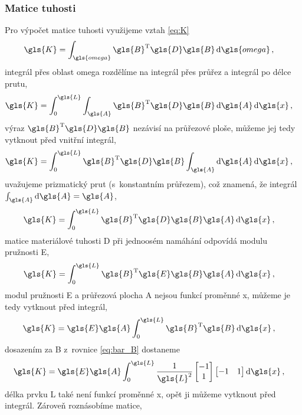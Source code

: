 \subsubsection*{Matice tuhosti}
Pro výpočet matice tuhosti využijeme vztah \ref{eq:K}
\begin{align*}
    \gls{K} &= \int_{\gls{omega}} \gls{B}^{\mathrm{T}}\gls{D}\gls{B} \dd{\gls{omega}},
\end{align*}
integrál přes oblast \gls{omega} rozdělíme na integrál přes průřez a integrál po délce prutu,
\begin{align*}
    \gls{K}  &= \int_{0}^{\gls{L}} \int_{\gls{A}} \gls{B}^{\mathrm{T}}\gls{D}\gls{B} \dd{\gls{A}} \dd{\gls{x}},
\end{align*}
výraz $\gls{B}^{\mathrm{T}}\gls{D}\gls{B}$ nezávisí na průřezové ploše, můžeme jej tedy vytknout před vnitřní integrál,
\begin{align*}
    \gls{K}  &= \int_{0}^{\gls{L}} \gls{B}^{\mathrm{T}}\gls{D}\gls{B} \int_{\gls{A}} \dd{\gls{A}} \dd{\gls{x}},
\end{align*}
uvažujeme prizmatický prut (s~konstantním průřezem), což znamená, že integrál $\int_{\gls{A}}\dd{\gls{A}} = \gls{A}$,
\begin{align*}
    \gls{K} &=\int_{0}^{\gls{L}} \gls{B}^{\mathrm{T}}\gls{D}\gls{B} \gls{A} \dd{\gls{x}},
\end{align*}
matice materiálové tuhosti \gls{D} při jednoosém namáhání odpovídá modulu pružnosti \gls{E},
\begin{align*}
    \gls{K} &=\int_{0}^{\gls{L}} \gls{B}^{\mathrm{T}}\gls{E}\gls{B} \gls{A} \dd{\gls{x}},
\end{align*}
modul pružnosti \gls{E} a průřezová plocha \gls{A} nejsou funkcí proměnné \gls{x}, můžeme je tedy vytknout před integrál,
\begin{align*}
    \gls{K} &= \gls{E} \gls{A} \int_{0}^{\gls{L}} \gls{B}^{\mathrm{T}}\gls{B} \dd{\gls{x}},
\end{align*}
dosazením za \gls{B} z~rovnice \ref{eq:bar_B} dostaneme
\begin{align*}
    \gls{K} &= \gls{E} \gls{A} \int_{0}^{\gls{L}} \frac{1}{\gls{L}^2} 
    \begin{bmatrix} -1 \\ 1 \end{bmatrix}
    \begin{bmatrix} -1 & 1 \end{bmatrix} \dd{\gls{x}},
\end{align*}
délka prvku \gls{L} také není funkcí proměnné \gls{x}, opět ji můžeme vytknout před integrál. Zároveň roznásobíme matice,
